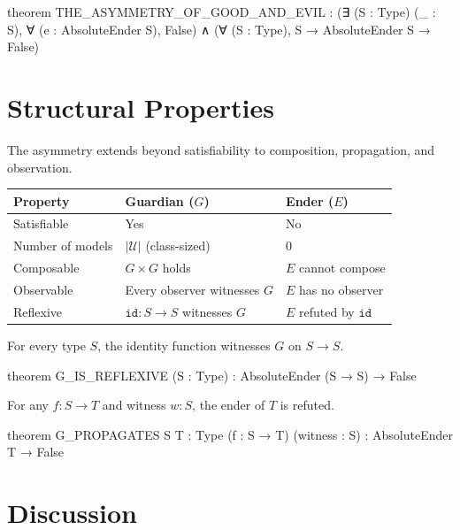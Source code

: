 \begin{leancode}
theorem THE_ASYMMETRY_OF_GOOD_AND_EVIL :
    (∃ (S : Type) (_ : S), ∀ (e : AbsoluteEnder S), False) ∧
    (∀ (S : Type), S → AbsoluteEnder S → False)
\end{leancode}

\section{Structural Properties}

The asymmetry extends beyond satisfiability to composition, propagation, and observation.

\begin{center}
\begin{tabular}{lll}
\toprule
\textbf{Property} & \textbf{Guardian ($G$)} & \textbf{Ender ($E$)} \\
\midrule
Satisfiable & Yes & No \\
Number of models & $|\mathcal{U}|$ (class-sized) & 0 \\
Composable & $G \times G$ holds & $E$ cannot compose \\
Observable & Every observer witnesses $G$ & $E$ has no observer \\
Reflexive & $\texttt{id} : S \to S$ witnesses $G$ & $E$ refuted by $\texttt{id}$ \\
\bottomrule
\end{tabular}
\end{center}

\begin{theorem}[G is reflexive]\label{thm:reflexive}
For every type $S$, the identity function witnesses $G$ on $S \to S$.
\end{theorem}

\begin{leancode}
theorem G_IS_REFLEXIVE (S : Type) :
    AbsoluteEnder (S → S) → False
\end{leancode}

\begin{theorem}\label{thm:propagates}
For any $f : S \to T$ and witness $w : S$, the ender of $T$ is refuted.
\end{theorem}

\begin{leancode}
theorem G_PROPAGATES {S T : Type} (f : S → T) (witness : S) :
    AbsoluteEnder T → False
\end{leancode}

\section{Discussion}

